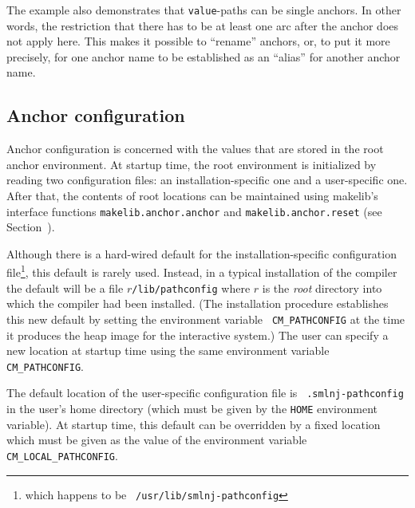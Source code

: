 The example also demonstrates that {\tt value}-paths can be single
anchors. In other words, the restriction that there has to be at least
one arc after the anchor does not apply here. This makes it possible
to ``rename'' anchors, or, to put it more precisely, for one anchor
name to be established as an ``alias'' for another anchor name.

\subsection{Anchor configuration}
\label{sec:anchor:config}

Anchor configuration is concerned with the values that are stored in
the root anchor environment.  At startup time, the root environment is
initialized by reading two configuration files: an
installation-specific one and a user-specific one.  After that, the
contents of root locations can be maintained using makelib's interface
functions {\tt makelib.anchor.anchor} and {\tt makelib.anchor.reset} (see
Section~).

Although there is a hard-wired default for the installation-specific
configuration file\footnote{which happens to be {\tt
/usr/lib/smlnj-pathconfig}}, this default is rarely used.
Instead, in a typical installation of the compiler the default will be a
file $r${\tt /lib/pathconfig} where $r$ is the {\it root} directory
into which the compiler had been installed.  (The installation procedure
establishes this new default by setting the environment variable {\tt
CM\_PATHCONFIG} at the time it produces the heap image for
the interactive system.)  The user can specify a new location at
startup time using the same environment variable {\tt CM\_PATHCONFIG}.

The default location of the user-specific configuration file is {\tt
.smlnj-pathconfig} in the user's home directory (which must be given
by the {\tt HOME} environment variable).  At startup time, this
default can be overridden by a fixed location which must be given as
the value of the environment variable {\tt CM\_LOCAL\_PATHCONFIG}.

